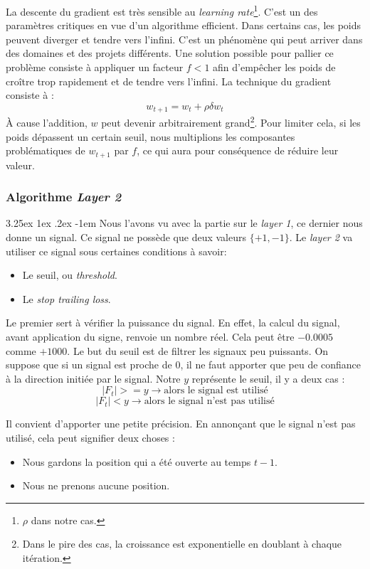 \documentclass[a4paper, 11pt]{article}
\makeatletter
\renewcommand\paragraph{\@startsection{paragraph}{5}{\z@}%
  {3.25ex \@plus1ex \@minus.2ex}%
  {-1em}%
  {\normalfont\normalsize\bfseries}}
\makeatother
\begin{document}
La descente du gradient est très sensible au \textit{learning rate}\footnote{$\rho$ dans notre cas.}. C'est un des paramètres critiques en vue d'un algorithme efficient\cite{no_more_pesky_learning_rate}. Dans certains cas, les poids peuvent diverger et
tendre vers l'infini. C'est un phénomène qui peut arriver dans des domaines et des projets différents\cite{no_more_pesky_learning_rate}. Une solution possible pour pallier ce problème 
consiste à appliquer un facteur $f < 1$ afin d'empêcher les poids de croître trop rapidement et de tendre vers l'infini.
La technique du gradient consiste à :
$$w_{t+1} = w_{t} + \rho \delta w_{t}$$
À cause l'addition, $w$ peut devenir arbitrairement grand\footnote{Dans le pire des cas, la croissance est exponentielle en doublant à chaque itération.}. Pour limiter cela, si les poids dépassent un certain seuil, nous multiplions les composantes problématiques de $w_{t+1}$ par $f$, ce qui aura pour conséquence de réduire leur valeur.


\subsubsection{Algorithme \textit{Layer 2}}
\paragraph{}
Nous l'avons vu avec la partie sur le \textit{layer 1}, ce dernier nous donne un signal. Ce signal ne possède que deux valeurs $\{+1,-1\}$. Le
\textit{layer 2} va utiliser ce signal sous certaines conditions à savoir:
\begin{itemize}
 \item Le seuil, ou \textit{threshold}.
 \item Le \textit{stop trailing loss}.
\end{itemize}

Le premier sert à vérifier la puissance du signal. En effet, la calcul du signal, avant application du signe, renvoie un nombre réel. Cela peut être
$-0.0005$ comme $+1000$. Le but du seuil est de filtrer les signaux peu puissants. On suppose que si un signal est proche de 0, il ne faut apporter que
peu de confiance à la direction initiée par le signal. Notre $y$ représente le seuil, il y a deux cas :
$$|F_t | >= y \rightarrow \text{alors le signal est utilisé}$$
$$|F_t | < y \rightarrow \text{alors le signal n'est pas utilisé}$$

Il convient d'apporter une petite précision. En annonçant que le signal n'est pas utilisé, cela peut signifier deux choses :
\begin{itemize}
 \item Nous gardons la position qui a été ouverte au temps $t-1$.
 \item Nous ne prenons aucune position.
\end{itemize}
\end{document}
